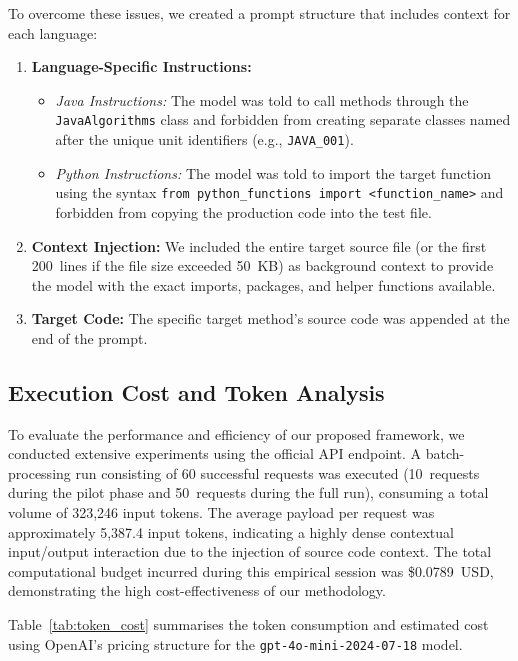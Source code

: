 To overcome these issues, we created a prompt structure that includes context for
each language:
\begin{enumerate}
    \item \textbf{Language-Specific Instructions:}
    \begin{itemize}
        \item \textit{Java Instructions:} The model was told to call methods
        through the \texttt{JavaAlgorithms} class and forbidden from creating
        separate classes named after the unique unit identifiers
        (e.g., \texttt{JAVA\_001}).
        \item \textit{Python Instructions:} The model was told to import the
        target function using the syntax
        \texttt{from python\_functions import <function\_name>} and forbidden
        from copying the production code into the test file.
    \end{itemize}
    \item \textbf{Context Injection:} We included the entire target source file
    (or the first 200~lines if the file size exceeded 50~KB) as background
    context to provide the model with the exact imports, packages, and helper
    functions available.
    \item \textbf{Target Code:} The specific target method's source code was
    appended at the end of the prompt.
\end{enumerate}

\subsection{Execution Cost and Token Analysis}
\label{subsec:execution_cost}

To evaluate the performance and efficiency of our proposed framework, we
conducted extensive experiments using the official API endpoint.
A batch-processing run consisting of 60 successful requests was executed
(10~requests during the pilot phase and 50~requests during the full run),
consuming a total volume of 323,246 input tokens.
The average payload per request was approximately 5,387.4 input tokens,
indicating a highly dense contextual input/output interaction due to the
injection of source code context.
The total computational budget incurred during this empirical session was
\$0.0789~USD, demonstrating the high cost-effectiveness of our methodology.

Table~\ref{tab:token_cost} summarises the token consumption and estimated cost
using OpenAI's pricing structure for the \texttt{gpt-4o-mini-2024-07-18} model.

